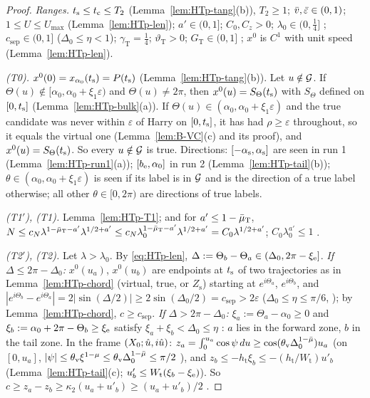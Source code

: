 \begin{proof}
\emph{Ranges.} $t_{\mathrm s}\le t_{\mathrm c}\le T_2$ (Lemma~\ref{lem:HTp-tang}(b)), $T_2\ge1$; $\bar v,\bar\varepsilon\in(0,1)$; $1\le U\le U_{\max}$
(Lemma~\ref{lem:HTp-len}); $a'\in(0,1]$; $C_0,C_z>0$; $\lambda_0\in(0,\frac14]$ ; $c_{\mathrm{sep}}\in(0,1]$ ($\Delta_0\le\eta<1$);
$\gamma_{\mathrm T}=\frac14$; $\vartheta_{\mathrm T}>0$; $G_{\mathrm T}\in(0,1]$ ; $x^0$ is $C^1$ with unit speed
(Lemma~\ref{lem:HTp-len}).

\emph{\textup{(T0)}.} $x^0(0)=x_{\alpha_0}(t_{\mathrm s})=P(t_{\mathrm s})$ (Lemma~\ref{lem:HTp-tang}(b)). Let $u\notin\mathcal G$. If
$\Theta(u)\notin[\alpha_0,\alpha_0+\xi_1\varepsilon)$ and $\Theta(u)\ne2\pi$, then $x^0(u)=S_\Theta(t_{\mathrm s})$ with $S_\Theta$ defined on $[0,t_{\mathrm s}]$
(Lemma~\ref{lem:HTp-bulk}(a)). If $\Theta(u)\in(\alpha_0,\alpha_0+\xi_1\varepsilon)$ and the true candidate was never within $\varepsilon$ of
Harry on $[0,t_{\mathrm s}]$, it has had $\rho\ge\varepsilon$ throughout, so it equals the virtual one (Lemma~\ref{lem:B-VC}(c) and its proof), and
$x^0(u)=S_\Theta(t_{\mathrm s})$. So every $u\notin\mathcal G$ is true. Directions: $[-\alpha_{\mathrm s},\alpha_{\mathrm s}]$ are seen in run 1 (Lemma~\ref{lem:HTp-run1}(a));
$[b_{\mathrm e},\alpha_0]$ in run 2 (Lemma~\ref{lem:HTp-tail}(b)); $\theta\in(\alpha_0,\alpha_0+\xi_1\varepsilon)$ is seen if its label is in $\mathcal G$
and is the direction of a true label otherwise; all other $\theta\in[0,2\pi)$ are directions of true labels.

\emph{\textup{(T1$'$)}, \textup{(T1)}.} Lemma~\ref{lem:HTp-T1}; and for $a'\le1-\bar\mu_{\mathrm T}$,
$N\le c_N\lambda^{1-\bar\mu_{\mathrm T}-a'}\lambda^{1/2+a'}\le c_N\lambda_0^{1-\bar\mu_{\mathrm T}-a'}\lambda^{1/2+a'}=C_0\lambda^{1/2+a'}$; $C_0\lambda_0^{a'}\le1$ .

\emph{\textup{(T2$'$)}, \textup{(T2)}.} Let $\lambda>\lambda_0$. By \eqref{eq:HTp-len}, $\Delta:=\Theta_b-\Theta_a\in(\Delta_0,2\pi-\xi_{\mathrm e}]$.
\emph{If $\Delta\le2\pi-\Delta_0$:} $x^0(u_a)$, $x^0(u_b)$ are endpoints at $t_{\mathrm s}$ of two trajectories as in Lemma~\ref{lem:HTp-chord}
(virtual, true, or $Z_{\mathrm s}$) starting at $e^{i\Theta_a}$, $e^{i\Theta_b}$, and $|e^{i\Theta_b}-e^{i\Theta_a}|=2|\sin(\Delta/2)|\ge
2\sin(\Delta_0/2)=c_{\mathrm{sep}}>2\varepsilon$ ($\Delta_0\le\eta\le\pi/6$, ); by Lemma~\ref{lem:HTp-chord}, $c\ge c_{\mathrm{sep}}$.
\emph{If $\Delta>2\pi-\Delta_0$:} $\xi_a:=\Theta_a-\alpha_0\ge0$ and $\xi_b:=\alpha_0+2\pi-\Theta_b\ge\xi_{\mathrm e}$ satisfy $\xi_a+\xi_b<\Delta_0\le\eta$
: $a$ lies in the forward zone, $b$ in the tail zone. In the frame $(X_0;\hat u,i\hat u)$:
$z_a=\int_0^{u_a}\cos\psi\,du\ge\cos(\theta_{\mathrm v}\Delta_0^{1-\bar\mu})u_a$ (on $[0,u_a]$, $|\psi|\le\theta_{\mathrm v}\xi^{1-\mu}\le
\theta_{\mathrm v}\Delta_0^{1-\bar\mu}\le\pi/2$ ), and $z_b\le-h_{\mathrm t}\xi_b\le-(h_{\mathrm t}/W_{\mathrm t})u'_b$
(Lemma~\ref{lem:HTp-tail}(c); $u'_b\le W_{\mathrm t}(\xi_b-\xi_{\mathrm e})$). So $c\ge z_a-z_b\ge\kappa_2(u_a+u'_b)\ge(u_a+u'_b)/2$ .


\end{proof}
